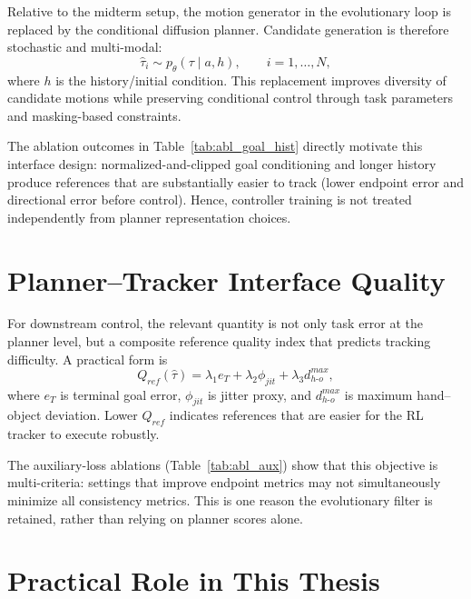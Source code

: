 \begin{itemize}
Relative to the midterm setup, the motion generator in the evolutionary loop is replaced by the conditional diffusion planner. Candidate generation is therefore stochastic and multi-modal:
\begin{equation}
\hat\tau_i \sim p_\theta(\tau \mid a, h), \qquad i=1,\dots,N,
\label{eq:candidate_sampling_diffusion}
\end{equation}
where $h$ is the history/initial condition. This replacement improves diversity of candidate motions while preserving conditional control through task parameters and masking-based constraints.

The ablation outcomes in Table~\ref{tab:abl_goal_hist} directly motivate this interface design: normalized-and-clipped goal conditioning and longer history produce references that are substantially easier to track (lower endpoint error and directional error before control). Hence, controller training is not treated independently from planner representation choices.

\section{Planner--Tracker Interface Quality}
\label{sec:planner_tracker_interface}

For downstream control, the relevant quantity is not only task error at the planner level, but a composite reference quality index that predicts tracking difficulty. A practical form is
\begin{equation}
Q_{ref}(\hat\tau)=\lambda_1 e_T + \lambda_2 \phi_{jit} + \lambda_3 d_{h\text{-}o}^{max},
\label{eq:ref_quality_idx}
\end{equation}
where $e_T$ is terminal goal error, $\phi_{jit}$ is jitter proxy, and $d_{h\text{-}o}^{max}$ is maximum hand--object deviation. Lower $Q_{ref}$ indicates references that are easier for the RL tracker to execute robustly.

The auxiliary-loss ablations (Table~\ref{tab:abl_aux}) show that this objective is multi-criteria: settings that improve endpoint metrics may not simultaneously minimize all consistency metrics. This is one reason the evolutionary filter is retained, rather than relying on planner scores alone.

\section{Practical Role in This Thesis}
\label{sec:rl_evo_practical_role}


\end{itemize}
